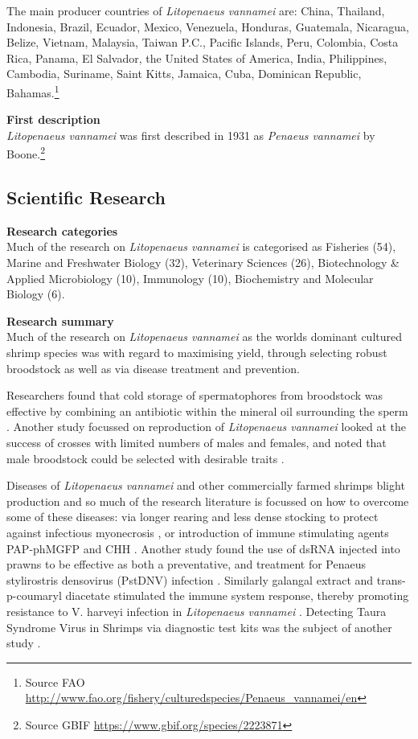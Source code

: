\documentclass[]{book}
\let\rmarkdownfootnote\footnote%
\def\footnote{\protect\rmarkdownfootnote}
\theoremstyle{definition}
\theoremstyle{definition}
\theoremstyle{definition}
\theoremstyle{remark}
\begin{document}
The main producer countries of \emph{Litopenaeus vannamei} are: China,
Thailand, Indonesia, Brazil, Ecuador, Mexico, Venezuela, Honduras,
Guatemala, Nicaragua, Belize, Vietnam, Malaysia, Taiwan P.C., Pacific
Islands, Peru, Colombia, Costa Rica, Panama, El Salvador, the United
States of America, India, Philippines, Cambodia, Suriname, Saint Kitts,
Jamaica, Cuba, Dominican Republic, Bahamas.\footnote{Source FAO
  \url{http://www.fao.org/fishery/culturedspecies/Penaeus_vannamei/en}}

\textbf{First description}\\
\emph{Litopenaeus vannamei} was first described in 1931 as \emph{Penaeus
vannamei} by Boone.\footnote{Source GBIF
  \url{https://www.gbif.org/species/2223871}}

\hypertarget{scientific-research-2}{%
\subsection{Scientific Research}\label{scientific-research-2}}

\textbf{Research categories}\\
Much of the research on \emph{Litopenaeus vannamei} is categorised as
Fisheries (54), Marine and Freshwater Biology (32), Veterinary Sciences
(26), Biotechnology \& Applied Microbiology (10), Immunology (10),
Biochemistry and Molecular Biology (6).

\textbf{Research summary}\\
Much of the research on \emph{Litopenaeus vannamei} as the worlds
dominant cultured shrimp species was with regard to maximising yield,
through selecting robust broodstock as well as via disease treatment and
prevention.

Researchers found that cold storage of spermatophores from broodstock
was effective by combining an antibiotic within the mineral oil
surrounding the sperm \citep{Tuantong_2015}. Another study focussed on
reproduction of \emph{Litopenaeus vannamei} looked at the success of
crosses with limited numbers of males and females, and noted that male
broodstock could be selected with desirable traits
\citep{Aungsuchawan_2008}.

Diseases of \emph{Litopenaeus vannamei} and other commercially farmed
shrimps blight production and so much of the research literature is
focussed on how to overcome some of these diseases: via longer rearing
and less dense stocking to protect against infectious myonecrosis
\citet{Silva_2010}, or introduction of immune stimulating agents
PAP-phMGFP and CHH \citep{Silva_2010, Khimmakthong_2011, Wanlem_2011}.
Another study found the use of dsRNA injected into prawns to be
effective as both a preventative, and treatment for Penaeus stylirostris
densovirus (PstDNV) infection \citep{Ho_2011}. Similarly galangal
extract and trans-p-coumaryl diacetate stimulated the immune system
response, thereby promoting resistance to V. harveyi infection in
\emph{Litopenaeus vannamei} \citep{Chaweepack_2014}. Detecting Taura
Syndrome Virus in Shrimps via diagnostic test kits was the subject of
another study \citep{Chaivisuthangkura_2006}.
\end{document}
